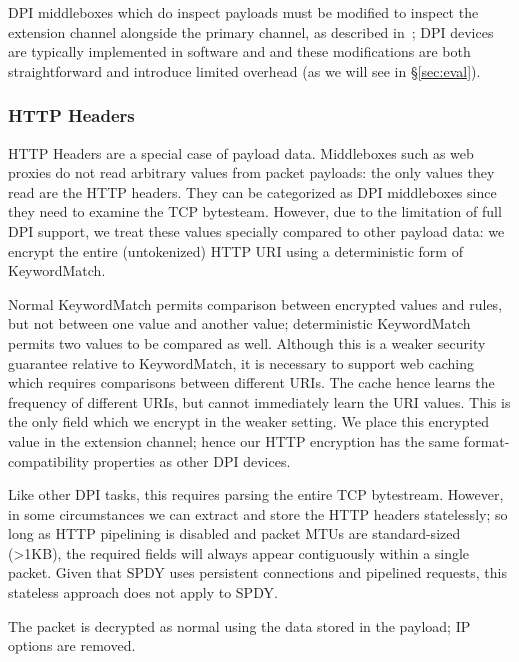DPI middleboxes which do inspect payloads must be modified to inspect the extension channel alongside the primary channel, as described in~\cite{blindbox}; DPI devices are typically implemented in software and and these modifications are both straightforward and introduce limited overhead (as we will see in \S\ref{sec:eval}). 

\subsubsection{HTTP Headers} 

HTTP Headers are a special case of payload data. Middleboxes such as web proxies do not read arbitrary values from packet payloads: the only values they read are the HTTP headers. They can be categorized as DPI middleboxes since they need to examine the TCP bytesteam. However, due to the limitation of full DPI support, we treat these values specially compared to other payload data: we encrypt the entire (untokenized) HTTP URI using a deterministic form of KeywordMatch.

Normal KeywordMatch permits comparison between encrypted values and rules, but not between one value and another value; deterministic KeywordMatch permits two values to be compared as well.
Although this is a weaker security guarantee relative to KeywordMatch, it is necessary to support web caching which requires comparisons between different URIs.
The cache hence learns the frequency of different URIs, but cannot immediately learn the URI values.
 This is the only field which we encrypt in the weaker setting.
We place this encrypted value in the extension channel; hence our HTTP encryption has the same format-compatibility properties as other DPI devices.

Like other DPI tasks, this requires parsing the entire TCP bytestream. However, in some circumstances we can extract and store the HTTP headers statelessly; so long as HTTP pipelining is disabled and packet MTUs are standard-sized (>1KB), the required fields will always appear contiguously within a single packet. Given that SPDY uses persistent connections and pipelined requests, this stateless approach does not apply to SPDY.

 The packet is decrypted as normal using the data stored in the payload; IP options are removed.


